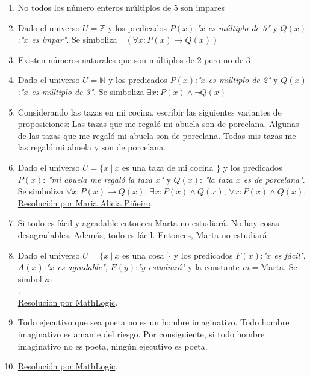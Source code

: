 \documentclass[a4paper]{article}
\newcommand{\answer}{\item[**]}
\newcommand{\then}{\to}
\begin{document}
\begin{enumerate}[resume]
\begin{enumerate} [label=(\alph*)]
		\item No todos los número enteros múltiplos de 5 son impares
		\answer Dado el universo $U = \mathbb{Z}$ y los predicados $P(x)$:\textit{"$x$ es múltiplo de 5"} y $Q(x)$:\textit{"$x$ es impar"}. Se simboliza $\neg \left(\forall x: P(x) \then  Q(x) \right)$

		\item Existen números naturales que son múltiplos de 2 pero no de 3
		\answer Dado el universo $U = \mathbb{N}$ y los predicados  $P(x)$:\textit{"$x$ es múltiplo de 2"} y $Q(x)$:\textit{"$x$ es múltiplo de 3"}. Se simboliza $\exists x: P(x) \land  \neg Q(x)$

		\item Considerando las tazas en mi cocina, escribir las siguientes variantes de proposiciones: Las tazas que me regaló mi abuela son de porcelana. Algunas de las tazas que me regaló mi abuela son de porcelana. Todas mis tazas me las regaló mi abuela y son de porcelana.
		\answer Dado el universo $U = \{x ~|~ x$ es una taza de mi cocina $\}$ y los predicados $P(x)$: \textit{"mi abuela me regaló la taza $x$"} y $Q(x)$: \textit{"la taza $x$ es de porcelana"}. Se simboliza $\forall x: P(x) \then Q(x)$, $\exists x: P(x) \land Q(x)$, $\forall x: P(x) \land Q(x)$. \href{https://youtu.be/aI-G5V-IGfA}{Resolución por Maria Alicia Piñeiro}.

		\item Si todo es fácil y agradable entonces Marta no estudiará. No hay cosas desagradables. Además, todo es fácil. Entonces, Marta no estudiará.
		\answer Dado el universo $U = \{x ~|~ x$ es una cosa $\}$ y los predicados $F(x)$:\textit{"$x$ es fácil"}, $A(x)$:\textit{"$x$ es agradable"}, $E(y)$:\textit{"$y$ estudiará"} y la constante $m=$Marta. Se simboliza \\  \Reasoning{$\left(\forall x: F(x) \land A(x) \right) \then \neg E(m)$;$\neg \left( \exists x: \neg A(x) \right)$;$\forall x: F(x)$}{$\neg E(m)$}. \\\href{https://youtu.be/M71MEB3TkVw?t=736}{Resolución por MathLogic}.

		\item Todo ejecutivo que sea poeta no es un hombre imaginativo. Todo hombre imaginativo es amante del riesgo. Por consiguiente, si todo hombre imaginativo no es poeta, ningún ejecutivo es poeta.
		\answer \href{https://youtu.be/M71MEB3TkVw?t=1191}{Resolución por MathLogic}.


\end{enumerate}
\end{enumerate}
\end{document}
